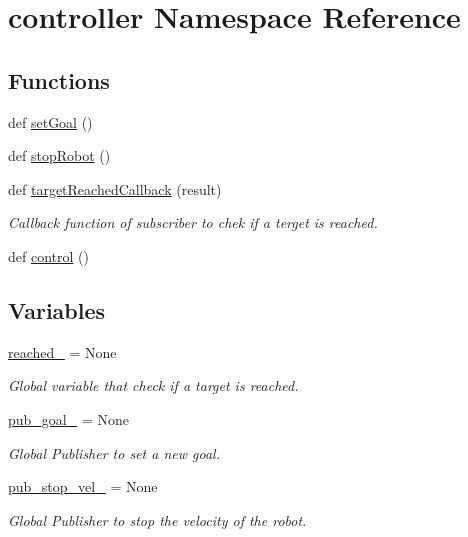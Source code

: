 \hypertarget{namespacecontroller}{}\section{controller Namespace Reference}
\label{namespacecontroller}
\subsection*{Functions}
\begin{DoxyCompactItemize}
\item 
def \hyperlink{namespacecontroller_a390107982046b42d626897f037ef4896}{set\+Goal} ()
\item 
def \hyperlink{namespacecontroller_a3ba3a77f1664636b10e961a018c7f66f}{stop\+Robot} ()
\item 
def \hyperlink{namespacecontroller_ab040192a9d158d9a008c04be63a2ef3e}{target\+Reached\+Callback} (result)
\begin{DoxyCompactList}\small\item\em Callback function of subscriber to chek if a terget is reached. \end{DoxyCompactList}\item 
def \hyperlink{namespacecontroller_aaff6338cd2edd1e5146feec03115941f}{control} ()
\end{DoxyCompactItemize}
\subsection*{Variables}
\begin{DoxyCompactItemize}
\item 
\hyperlink{namespacecontroller_a240640e002c30765d0b09505fc64f5e7}{reached\+\_\+} = None
\begin{DoxyCompactList}\small\item\em Global variable that check if a target is reached. \end{DoxyCompactList}\item 
\hyperlink{namespacecontroller_a4937e30f10eec1bb2642391fd378d973}{pub\+\_\+goal\+\_\+} = None
\begin{DoxyCompactList}\small\item\em Global Publisher to set a new goal. \end{DoxyCompactList}\item 
\hyperlink{namespacecontroller_a4eff46b5a67216f8bf8eb3d09ca4aea1}{pub\+\_\+stop\+\_\+vel\+\_\+} = None
\begin{DoxyCompactList}\small\item\em Global Publisher to stop the velocity of the robot. \end{DoxyCompactList}\end{DoxyCompactItemize}


